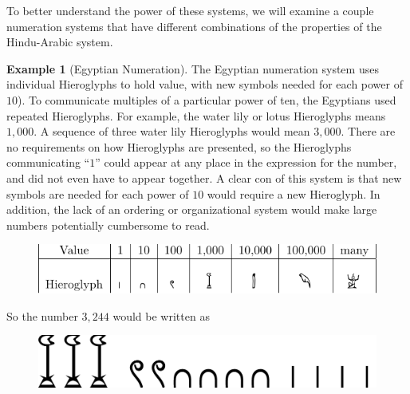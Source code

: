 \documentclass[
]{book}
\theoremstyle{definition}
\theoremstyle{definition}
\newtheorem{example}{Example}[chapter]
\theoremstyle{definition}
\theoremstyle{definition}
\theoremstyle{remark}
\begin{document}
To better understand the power of these systems, we will examine a couple numeration systems that have different combinations of the properties of the Hindu-Arabic system.

\begin{example}[Egyptian Numeration]

The Egyptian numeration system uses individual Hieroglyphs to hold value, with new symbols needed for each power of \(10\)). To communicate multiples of a particular power of ten, the Egyptians used repeated Hieroglyphs. For example, the water lily or lotus Hieroglyphs means \(1,000\). A sequence of three water lily Hieroglyphs would mean \(3,000\). There are no requirements on how Hieroglyphs are presented, so the Hieroglyphs communicating ``\(1\)'' could appear at any place in the expression for the number, and did not even have to appear together. A clear con of this system is that new symbols are needed for each power of \(10\) would require a new Hieroglyph. In addition, the lack of an ordering or organizational system would make large numbers potentially cumbersome to read.

\begin{figure}

{\centering \includegraphics[width=0.9\linewidth]{tikz/hieroglyphs} 

}

\end{figure}

So the number \(3,244\) would be written as

\begin{figure}

{\centering \includegraphics[width=0.4\linewidth]{tikz/hieroglyphs2} 

}

\end{figure}

\end{example}
\end{document}
